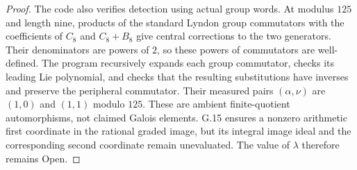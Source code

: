 \begin{proof}
The code also verifies detection using actual group words.
At modulus $125$ and length nine, products of the standard
Lyndon group commutators with the coefficients of $C_8$ and
$C_8+B_8$ give central corrections to the two generators.
Their denominators are powers of $2$, so these powers of
commutators are well-defined. The program recursively expands
each group commutator, checks its leading Lie polynomial, and
checks that the resulting substitutions have inverses and
preserve the peripheral commutator. Their measured pairs
$(\alpha,\nu)$ are $(1,0)$ and $(1,1)$ modulo $125$.
These are ambient finite-quotient automorphisms, not claimed
Galois elements. G.15 ensures a nonzero arithmetic first
coordinate in the rational graded image, but its integral
image ideal and the corresponding second coordinate remain
unevaluated. The value of $\lambda$ therefore remains Open.
\end{proof}

